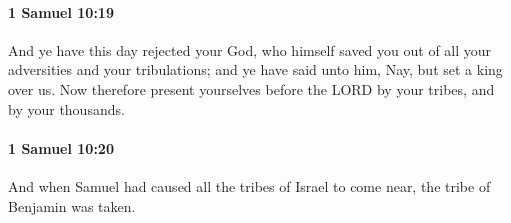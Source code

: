 		\paragraph{1 Samuel 10:19} %
			\label{1SAMUEL-10-19}

			And ye have this day rejected your God, who himself saved you out of all your adversities and your tribulations; and ye have said unto him, Nay, but set a king over us. Now therefore present yourselves before the LORD by your tribes, and by your thousands.


		\paragraph{1 Samuel 10:20} %
			\label{1SAMUEL-10-20}

			And when Samuel had caused all the tribes of Israel to come near, the tribe of Benjamin was taken.


